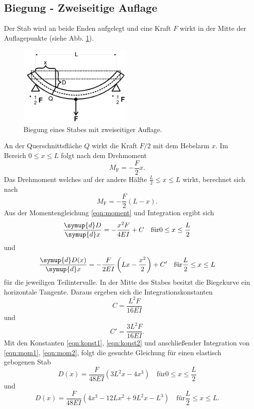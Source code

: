\subsection{Biegung - Zweiseitige Auflage}
Der Stab wird an beide Enden aufgelegt und eine Kraft $F$ wirkt in der Mitte der Auflagepunkte (siehe Abb. \ref{fig:beidseitig}).
\begin{figure}
    \centering
    \includegraphics[width=0.5\textwidth]{content/data/beidseitig.jpg}
    \caption{Biegung eines Stabes mit zweiseitiger Auflage. \cite{anleitung}}
    \label{fig:beidseitig} 
\end{figure}
An der Querschnittsfläche $Q$ wirkt die Kraft $F/2$ mit dem Hebelarm $x$.
Im Bereich $0 \leq x \leq L$ folgt nach dem Drehmoment
\begin{equation*}
    M_\text{F} = -\frac{F}{2}x .
\end{equation*}
Das Drehmoment welches auf der andere Hälfte $\frac{L}{2} \leq x \leq L$ wirkt, berechnet sich nach
\begin{equation*}
    M_\text{F} = -\frac{F}{2}(L-x) .
\end{equation*}
Aus der Momentengleichung \eqref{eqn:moment} und Integration ergibt sich
\begin{equation}
    \frac{\symup{d}D}{\symup{d}x} = - \frac{x^2F}{4EI} + C \quad \text{für} 0 \leq x \leq \frac{L}{2}
    \label{eqn:mom1}
\end{equation}
und
\begin{equation}
    \frac{\symup{d}D(x)}{\symup{d}x} = -\frac{F}{2EI} \left( Lx-\frac{x^2}{2} \right) + C' \quad \text{für} \frac{L}{2} \leq x \leq L
    \label{eqn:mom2}
\end{equation}
für die jeweiligen Teilintervalle.
In der Mitte des Stabes besitzt die Biegekurve ein horizontale Tangente.
Daraus ergeben sich die Integrationskonstanten
\begin{equation}
    C = \frac{L^2F}{16EI}
    \label{eqn:konst1}
\end{equation}
und
\begin{equation}
    C' = \frac{3L^2F}{16EI} .
    \label{eqn:konst2}
\end{equation}
Mit den Konstanten \eqref{eqn:konst1}, \eqref{eqn:konst2} und anschließender Integration von \eqref{eqn:mom1}, \eqref{eqn:mom2}, folgt die gesuchte Gleichung für einen elastisch gebogenen Stab
\begin{equation}
    D(x) = \frac{F}{48 E I} \left( 3L^2x -4x^3 \right) \quad \text{für} 0 \leq x \leq \frac{L}{2}
    \label{eqn:moment_links}
\end{equation}
und
\begin{equation}
    D(x) = \frac{F}{48EI} \left( 4x^3-12Lx^2+9L^2x-L^3 \right) \quad \text{für} \frac{L}{2} \leq x \leq L .
\end{equation}